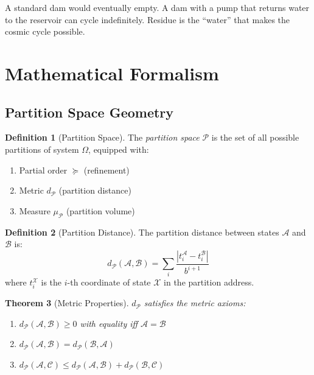 \documentclass[twocolumn,10pt,a4paper]{article}
\newtheorem{theorem}{Theorem}[section]
\theoremstyle{definition}
\newtheorem{definition}[theorem]{Definition}
\theoremstyle{remark}
\newcommand{\Partition}{\mathcal{P}}
\newcommand{\Pspace}{\mathcal{P}}
\begin{document}
A standard dam would eventually empty. A dam with a pump that returns water to the reservoir can cycle indefinitely. Residue is the ``water'' that makes the cosmic cycle possible.

\section{Mathematical Formalism}
\label{sec:formalism}

\subsection{Partition Space Geometry}

\begin{definition}[Partition Space]
\label{def:pspace}
The \emph{partition space} $\Pspace$ is the set of all possible partitions of system $\Omega$, equipped with:
\begin{enumerate}
    \item Partial order $\succeq$ (refinement)
    \item Metric $d_{\Partition}$ (partition distance)
    \item Measure $\mu_{\Partition}$ (partition volume)
\end{enumerate}
\end{definition}

\begin{definition}[Partition Distance]
\label{def:pdist}
The partition distance between states $\mathcal{A}$ and $\mathcal{B}$ is:
\begin{equation}
    d_{\Partition}(\mathcal{A}, \mathcal{B}) = \sum_{i} \frac{|t_i^{\mathcal{A}} - t_i^{\mathcal{B}}|}{b^{i+1}}
\end{equation}
where $t_i^{\mathcal{X}}$ is the $i$-th coordinate of state $\mathcal{X}$ in the partition address.
\end{definition}

\begin{theorem}[Metric Properties]
\label{thm:metric}
$d_{\Partition}$ satisfies the metric axioms:
\begin{enumerate}
    \item $d_{\Partition}(\mathcal{A}, \mathcal{B}) \geq 0$ with equality iff $\mathcal{A} = \mathcal{B}$
    \item $d_{\Partition}(\mathcal{A}, \mathcal{B}) = d_{\Partition}(\mathcal{B}, \mathcal{A})$
    \item $d_{\Partition}(\mathcal{A}, \mathcal{C}) \leq d_{\Partition}(\mathcal{A}, \mathcal{B}) + d_{\Partition}(\mathcal{B}, \mathcal{C})$
\end{enumerate}
\end{theorem}
\end{document}
